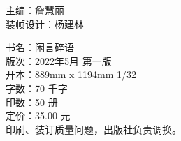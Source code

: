 \documentclass[twoside]{ctexbook}
\begin{document}


% 
\thispagestyle{empty}


\clearpage

\thispagestyle{empty}
\vspace*{\fill}

\begin{flushleft}
  \begingroup

  主\hspace*{2\ccwd}编：詹慧丽\\
  装帧设计：杨建林\\
  \endgroup
\end{flushleft}
\vspace{3em}
\begin{flushleft}

  \begingroup

  书\hspace*{2\ccwd}名：闲言碎语\\
  版\hspace*{2\ccwd}次：2022年5月 第一版\\
  开\hspace*{2\ccwd}本：889mm x 1194mm  1/32\\
  字\hspace*{2\ccwd}数：70 千字\\
  印\hspace*{2\ccwd}数：50 册\\
  定\hspace*{2\ccwd}价：35.00 元\\
  \vspace{2em}
  印刷、装订质量问题，出版社负责调换。
  \endgroup
\end{flushleft}

\clearpage

\thispagestyle{empty}

\vspace*{3em}
\hspace{3em}
\newpage
\thispagestyle{empty}
\
\newpage
\setcounter{page}{1}
\heiti{\tableofcontents}
\thispagestyle{empty}

\songti
\mainmatter
\hypersetup{pageanchor=true}




% 
\end{document}
